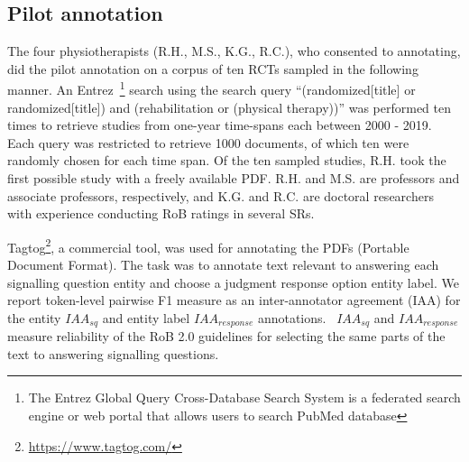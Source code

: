 \documentclass{IOS-Book-Article}
\begin{document}
\subsection{Pilot annotation}
\label{subsec:annotation}
%
The four physiotherapists (R.H., M.S., K.G., R.C.), who consented to annotating, did the pilot annotation on a corpus of ten RCTs sampled in the following manner.
An Entrez~\footnote{The Entrez Global Query Cross-Database Search System is a federated search engine or web portal that allows users to search PubMed database} search using the search query ``{\selectfont (randomized[title] or randomized[title]) and (rehabilitation or (physical therapy))}'' was performed ten times to retrieve studies from one-year time-spans each between 2000 - 2019.
Each query was restricted to retrieve 1000 documents, of which ten were randomly chosen for each time span.
Of the ten sampled studies, R.H. took the first possible study with a freely available PDF.
R.H. and M.S. are professors and associate professors, respectively, and K.G. and R.C. are doctoral researchers with experience conducting RoB ratings in several SRs.


Tagtog\footnote{\url{https://www.tagtog.com/}}, a commercial tool, was used for annotating the PDFs (Portable Document Format).
The task was to annotate text relevant to answering each signalling question entity and choose a judgment response option entity label.
We report token-level pairwise F1 measure as an inter-annotator agreement (IAA) for the entity $IAA_{sq}$ and entity label $IAA_{response}$ annotations.~\cite{deleger2012building}
$IAA_{sq}$ and $IAA_{response}$ measure reliability of the RoB 2.0 guidelines for selecting the same parts of the text to answering signalling questions.
%
%
%
\end{document}
